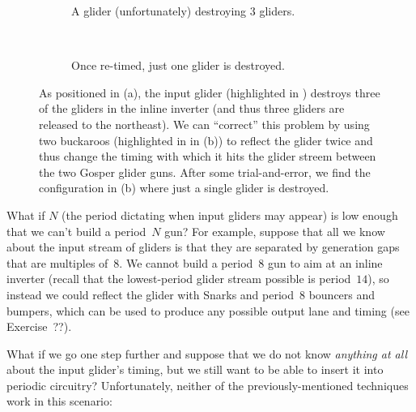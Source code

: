 \begin{figure}[!htb]
	\centering
	\begin{subfigure}{.48\textwidth}
		\centering
		\caption{A glider (unfortunately) destroying $3$ gliders.}
		\label{fig:inverter_as_regulator_0}
	\end{subfigure} \ \ \ \ %
	\begin{subfigure}{.48\textwidth}
		\centering
		\caption{Once re-timed, just one glider is destroyed.}
		\label{fig:inverter_as_regulator_1}
	\end{subfigure}
	\caption{As positioned in (a), the input glider (highlighted in ) destroys three of the gliders in the inline inverter (and thus three gliders are released to the northeast). We can ``correct'' this problem by using two buckaroos (highlighted in  in (b)) to reflect the glider twice and thus change the timing with which it hits the glider streem between the two Gosper glider guns. After some trial-and-error, we find the configuration in (b) where just a single glider is destroyed.}\label{fig:inverter_as_regulator}
\end{figure}

What if $N$ (the period dictating when input gliders may appear) is low enough that we can't build a period~$N$ gun? For example, suppose that all we know about the input stream of gliders is that they are separated by generation gaps that are multiples of~$8$. We cannot build a period~$8$ gun to aim at an inline inverter (recall that the lowest-period glider stream possible is period~$14$), so instead we could reflect the glider with Snarks and period~$8$ bouncers and bumpers, which can be used to produce any possible output lane and timing (see Exercise~??).

What if we go one step further and suppose that we do not know \emph{anything at all} about the input glider's timing, but we still want to be able to insert it into periodic circuitry? Unfortunately, neither of the previously-mentioned techniques work in this scenario:\smallskip

